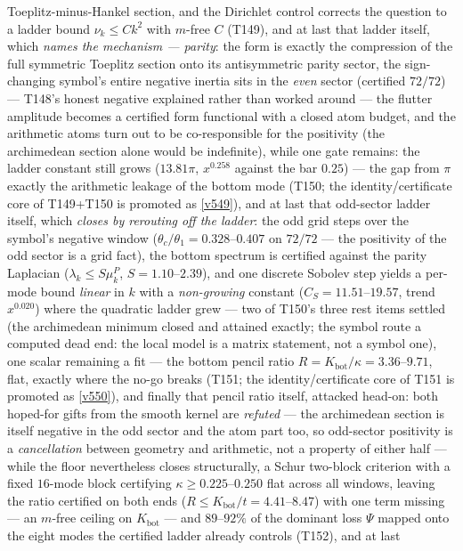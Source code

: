 \documentclass[11pt,a4paper]{article}
\begin{document}
Toeplitz-minus-Hankel section, and the Dirichlet control corrects the question to a ladder
bound $\nu_k\le Ck^2$ with $m$-free $C$ (T149), and at last that ladder itself, which
\emph{names the mechanism --- parity}: the form is exactly the compression of the full
symmetric Toeplitz section onto its antisymmetric parity sector, the sign-changing symbol's
entire negative inertia sits in the \emph{even} sector (certified $72/72$) --- T148's honest
negative explained rather than worked around --- the flutter amplitude becomes a certified
form functional with a closed atom budget, and the arithmetic atoms turn out to be
co-responsible for the positivity (the archimedean section alone would be indefinite), while
one gate remains: the ladder constant still grows ($13.81\pi$, $x^{0.258}$ against the bar
$0.25$) --- the gap from $\pi$ exactly the arithmetic leakage of the bottom mode (T150; the
identity/certificate core of T149+T150 is promoted as \vref{v549}), and at last that
odd-sector ladder itself, which \emph{closes by rerouting off the ladder}: the odd grid steps
over the symbol's negative window ($\theta_c/\theta_1=0.328$--$0.407$ on $72/72$ --- the
positivity of the odd sector is a grid fact), the bottom spectrum is certified against the
parity Laplacian ($\lambda_k\le S\mu^P_k$, $S=1.10$--$2.39$), and one discrete Sobolev step
yields a per-mode bound \emph{linear} in $k$ with a \emph{non-growing} constant
($C_S=11.51$--$19.57$, trend $x^{0.020}$) where the quadratic ladder grew --- two of T150's
three rest items settled (the archimedean minimum closed and attained exactly; the symbol
route a computed dead end: the local model is a matrix statement, not a symbol one), one
scalar remaining a fit --- the bottom pencil ratio $R=K_{\mathrm{bot}}/\kappa=3.36$--$9.71$,
flat, exactly where the no-go breaks (T151; the identity/certificate core of T151 is promoted
as \vref{v550}), and finally that pencil ratio itself, attacked head-on: both hoped-for
gifts from the smooth kernel are \emph{refuted} --- the archimedean section is itself
negative in the odd sector and the atom part too, so odd-sector positivity is a
\emph{cancellation} between geometry and arithmetic, not a property of either half ---
while the floor nevertheless closes structurally, a Schur two-block criterion with a fixed
$16$-mode block certifying $\kappa\ge0.225$--$0.250$ flat across all windows, leaving the
ratio certified on both ends ($R\le K_{\mathrm{bot}}/t=4.41$--$8.47$) with one term missing
--- an $m$-free ceiling on $K_{\mathrm{bot}}$ --- and $89$--$92\%$ of the dominant loss
$\Psi$ mapped onto the eight modes the certified ladder already controls (T152), and at last
\end{document}
